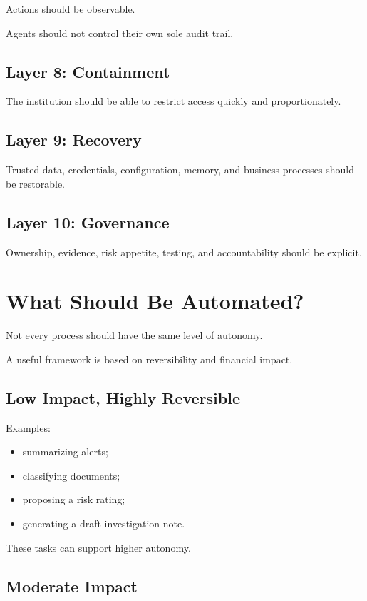 Actions should be observable.

Agents should not control their own sole audit trail.

\subsection{Layer 8: Containment}

The institution should be able to restrict access quickly and proportionately.

\subsection{Layer 9: Recovery}

Trusted data, credentials, configuration, memory, and business processes should be restorable.

\subsection{Layer 10: Governance}

Ownership, evidence, risk appetite, testing, and accountability should be explicit.

\section{What Should Be Automated?}

Not every process should have the same level of autonomy.

A useful framework is based on reversibility and financial impact.

\subsection{Low Impact, Highly Reversible}

Examples:

\begin{itemize}
    \item summarizing alerts;
    \item classifying documents;
    \item proposing a risk rating;
    \item generating a draft investigation note.
\end{itemize}

These tasks can support higher autonomy.

\subsection{Moderate Impact}

